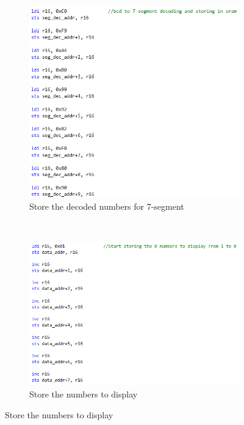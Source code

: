 \documentclass{article}
\begin{document}
	\begin{figure}[h!]
		\centering
		\begin{subfigure}[t]{0.5\textwidth}
			\centering
			\includegraphics[width=0.8\linewidth]{./results/lab2_dec_data.png}
			\caption{Store the decoded numbers for 7-segment}
		\end{subfigure}%
		~
		\begin{subfigure}[t]{0.5\textwidth}
			\centering
			\includegraphics[width=\linewidth]{./results/lab2_display_data.png}
			\caption{Store the numbers to display}
		\end{subfigure}
	

\end{figure}
\end{document}

